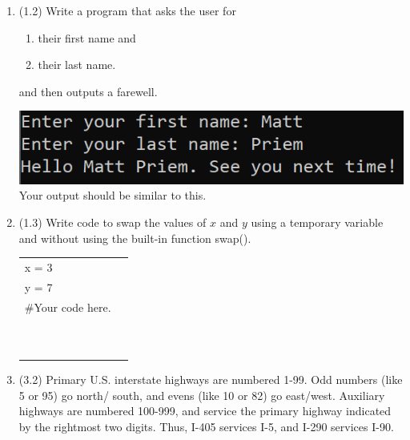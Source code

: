 \documentclass{article}
\begin{document}
\begin{enumerate}
\item (1.2) 
		Write a program that asks the user for \\
		\begin{minipage}{0.5\textwidth}
		\vspace*{-0.5em}
			\begin{enumerate}  \setlength\itemsep{-0.3em}
				\item their first name and
				\item their last name.  
			\end{enumerate} \vspace*{-1ex}
		and then outputs a farewell.
		\end{minipage}
		\begin{minipage}{0.5\textwidth}
			\centering
			\includegraphics[scale=0.9]{./imgs/outputFarewell.png}\\
			Your output should be similar to this.
		\end{minipage}



\item (1.3) 
		Write code to swap the values of $x$ and $y$ using a temporary variable and without using
		the built-in function swap().\\		
		\begin{tabular}{|ll}
			\\			
			x = 3\\
			y = 7\\[5pt]
			\#Your code here. \\[5pt]
			& \\ & \\ & \\ & \\ & \\ & \\ & \\ & \\ & \\ & \\ 
		\end{tabular}



\item (3.2)  
		Primary U.S. interstate highways are numbered 1-99.  Odd numbers (like 5 or 95) go north/
		south, and evens (like 10 or 82) go east/west.  Auxiliary highways are numbered 100-999, and 
		service the primary highway indicated by the rightmost two digits.  Thus, I-405 services 
		I-5, and I-290 services I-90.
		

\end{enumerate}
\end{document}
